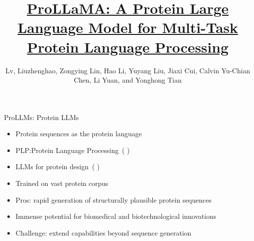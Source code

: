\documentclass[dvipsnames,
hyperref={
	citecolor=blue,
	colorlinks=true,
	urlcolor=blue,
	linkcolor=,
}
]{beamer}
\title[ProLLaMA]
{\href{https://doi.org/10.48550/arXiv.2402.16445}{ProLLaMA: A Protein Large Language Model for Multi-Task Protein Language Processing}}
\author[Liuzhenghao Lv et al.]{Lv, Liuzhenghao, Zongying Lin, Hao Li, Yuyang Liu, Jiaxi Cui, Calvin Yu-Chian Chen, Li Yuan, and Yonghong Tian}
\date{}%
\let\oldcite\cite
\renewcommand{\cite}[1]{{\color{blue} \oldcite{#1}}}
\begin{document}
\begin{frame}
\titlepage
\end{frame}




\begin{frame}{ProLLMs: Protein LLMs}
	\begin{itemize}\setlength\itemsep{1.5em}
		\item Protein sequences as the protein language
		\item PLP:Protein Language Processing~(\cite{bepler2021learning,ofer2021language})
		\item LLMs for protein design~(\cite{strokach2022deep,ferruz2022controllable})~
		\item Trained on vast protein corpus
		\item Pros: rapid generation of structurally plausible protein sequences
		\item Immense potential for biomedical and biotechnological innovations
		\item Challenge: extend capabilities beyond sequence generation
	\end{itemize}
\end{frame}


\end{document}
